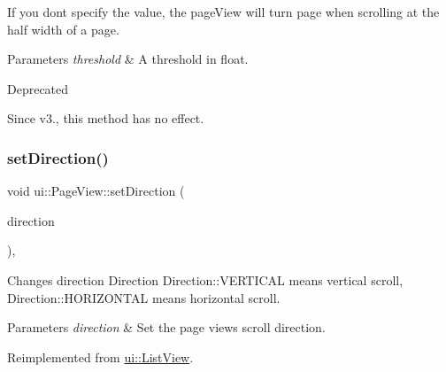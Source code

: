 If you don\textquotesingle{}t specify the value, the page\+View will turn page when scrolling at the half width of a page. 


\begin{DoxyParams}{Parameters}
{\em threshold} & A threshold in float. \\
\hline
\end{DoxyParams}
\begin{DoxyRefDesc}{Deprecated}
\item[\hyperlink{deprecated__deprecated000386}{Deprecated}]Since v3., this method has no effect. \end{DoxyRefDesc}
\mbox{\label{classui_1_1PageView_a594124394d2bc1dff86069b87939b14c}} 
\subsubsection{\texorpdfstring{set\+Direction()}{setDirection()}\hspace{0.1cm}{\footnotesize\ttfamily [1/2]}}
{\footnotesize\ttfamily void ui\+::\+Page\+View\+::set\+Direction (\begin{DoxyParamCaption}\item[{\hyperlink{classui_1_1ScrollView_aed2d778ae8098dcafe323b2beae8dd6b}{Page\+View\+::\+Direction}}]{direction }\end{DoxyParamCaption})\hspace{0.3cm}{\ttfamily [override]}, {\ttfamily [virtual]}}

Changes direction Direction Direction\+::\+V\+E\+R\+T\+I\+C\+AL means vertical scroll, Direction\+::\+H\+O\+R\+I\+Z\+O\+N\+T\+AL means horizontal scroll. 
\begin{DoxyParams}{Parameters}
{\em direction} & Set the page view\textquotesingle{}s scroll direction. \\
\hline
\end{DoxyParams}


Reimplemented from \hyperlink{classui_1_1ListView_aaac3381602537a823529058b64bffabf}{ui\+::\+List\+View}.

\mbox{\label{classui_1_1PageView_a4ac6e8672026f60e326ffc054d167365}} 
